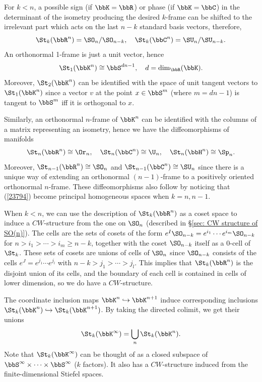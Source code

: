 \begin{rem}
    For $k<n$, a possible sign (if $\bbK=\bbR$) or phase (if $\bbK=\bbC$) in the determinant of the isometry producing the desired $k$-frame can be shifted to the irrelevant part which acts on the last $n-k$ standard basis vectors, therefore,
    \[\St_k(\bbR^n)=\SO_n\slash \SO_{n-k},\quad \St_k(\bbC^n)=\SU_n\slash \SU_{n-k}.\label{23794}\]
    An orthonormal 1-frame is just a unit vector, hence
    \[\St_1(\bbK^n)\cong \bbS^{dn-1},\quad d=\dim_\bbR(\bbK).\]
    Moreover, $\St_2(\bbK^n)$ can be identified with the space of unit tangent vectors to $\St_1(\bbK^n)$  since a vector $v$ at the point $x\in \bbS^m$ (where $m=dn-1$) is tangent to $\bbS^m$ iff it is orthogonal to $x$.
    
    Similarly, an orthonormal $n$-frame of $\bbK^n$ can be identified with the columns of a matrix representing an isometry, hence we have the diffeomorphisms of manifolds
    \[\St_n(\bbR^n)\cong \Or_n,\quad \St_n(\bbC^n)\cong\U_n, \quad \St_n(\bbH^n)\cong\Sp_n.\]
    Moreover, $\St_{n-1}(\bbR^n)\cong \SO_n$ and $\St_{n-1}(\bbC^n)\cong \SU_n$ since there is a unique way of extending an orthonormal $(n-1)$-frame to a positively oriented orthonormal $n$-frame. These diffeomorphisms also follow by noticing that (\ref{23794}) become principal homogeneous spaces when $k=n,n-1$.
\end{rem}


When $k<n$, we can use the description of $\St_k(\bbR^n)$ as a coset space to induce a $CW$-structure from the one on $\SO_n$ (described in \S\ref{sec: CW structure of SO(n)}). The cells are the sets of cosets of the form $e^I\SO_{n-k}=e^{i_1}\cdots e^{i_m}\SO_{n-k}$ for $n>i_1>\cdots >i_m\geq n-k$, together with the coset $\SO_{n-k}$ itself as a $0$-cell of $\St_k$. These sets of cosets are unions of cells of $\SO_n$ since $\SO_{n-k}$ consists of the cells $e^J=e^{j_1}\cdots e^{j_l}$ with $n-k>j_1>\cdots >j_l$. This implies that $\St_k(\bbR^n)$ is the disjoint union of its cells, and the boundary of each cell is contained in cells of lower dimension, so we do have a $CW$-structure.


\begin{defn}
    The coordinate inclusion maps $\bbK^n\hookrightarrow \bbK^{n+1}$ induce corresponding inclusions $\St_k(\bbK^n)\hookrightarrow \St_k(\bbK^{n+1})$. By taking the directed colimit, we get their unions
    \[\St_k(\bbK^\infty)=\bigcup_n \St_k(\bbK^n).\]
    Note that $\St_k(\bbK^\infty)$ can be thought of as a closed subspace of $\bbS^\infty\times\cdots\times \bbS^\infty$ ($k$ factors). It also has a $CW$-structure induced from the finite-dimensional Stiefel spaces.
\end{defn}




